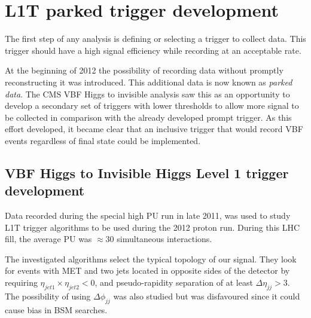 \section{L1T parked trigger development}
\label{SECTION:PreparationParkedDataAnalysis_ParkedTriggerDevelopment}


The first step of any analysis is defining or selecting a trigger to collect data. This trigger should have a high signal efficiency while recording at an acceptable rate.

At the beginning of 2012 the possibility of recording data without promptly reconstructing it was introduced. This additional data is now known as \textit{parked data}. The \gls{CMS} \gls{VBF} Higgs to invisible analysis saw this as an opportunity to develop a secondary set of triggers with lower thresholds to allow more signal to be collected in comparison with the already developed prompt trigger. As this effort developed, it became clear that an inclusive trigger that would record \gls{VBF} events regardless of final state could be implemented.

\subsection{VBF Higgs to Invisible Higgs Level 1 trigger development}
\label{SUBSECTION:ParkedDataAnalysis_ParkedTriggerDevelopment_VBFHiggsInvisibleTrigger}


Data recorded during the special high \gls{PU} run in late 2011, was used to study \gls{L1T} trigger algorithms to be used during the 2012 proton run. During this \gls{LHC} fill, the average \gls{PU} was $\approx 30$ simultaneous interactions. 

The investigated algorithms select the typical topology of our signal. They look for events with \gls{MET} and two jets located in opposite sides of the detector by requiring $\eta_{jet1}\times\eta_{jet2}<0$, and pseudo-rapidity separation of at least $\Delta\eta_{jj}>3$. The possibility of using $\Delta\phi_{jj}$ was also studied but was disfavoured since it could cause bias in \gls{BSM} searches.

